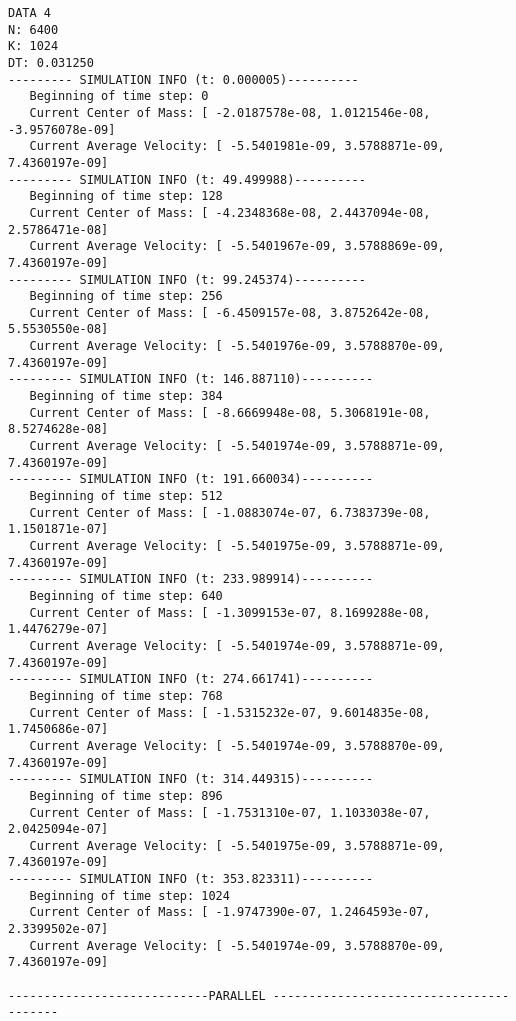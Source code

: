 \documentclass[11pt]{article}
\begin{document}
\begin{verbatim}
DATA 4
N: 6400
K: 1024
DT: 0.031250
--------- SIMULATION INFO (t: 0.000005)----------
   Beginning of time step: 0
   Current Center of Mass: [ -2.0187578e-08, 1.0121546e-08, -3.9576078e-09]
   Current Average Velocity: [ -5.5401981e-09, 3.5788871e-09, 7.4360197e-09]
--------- SIMULATION INFO (t: 49.499988)----------
   Beginning of time step: 128
   Current Center of Mass: [ -4.2348368e-08, 2.4437094e-08, 2.5786471e-08]
   Current Average Velocity: [ -5.5401967e-09, 3.5788869e-09, 7.4360197e-09]
--------- SIMULATION INFO (t: 99.245374)----------
   Beginning of time step: 256
   Current Center of Mass: [ -6.4509157e-08, 3.8752642e-08, 5.5530550e-08]
   Current Average Velocity: [ -5.5401976e-09, 3.5788870e-09, 7.4360197e-09]
--------- SIMULATION INFO (t: 146.887110)----------
   Beginning of time step: 384
   Current Center of Mass: [ -8.6669948e-08, 5.3068191e-08, 8.5274628e-08]
   Current Average Velocity: [ -5.5401974e-09, 3.5788871e-09, 7.4360197e-09]
--------- SIMULATION INFO (t: 191.660034)----------
   Beginning of time step: 512
   Current Center of Mass: [ -1.0883074e-07, 6.7383739e-08, 1.1501871e-07]
   Current Average Velocity: [ -5.5401975e-09, 3.5788871e-09, 7.4360197e-09]
--------- SIMULATION INFO (t: 233.989914)----------
   Beginning of time step: 640
   Current Center of Mass: [ -1.3099153e-07, 8.1699288e-08, 1.4476279e-07]
   Current Average Velocity: [ -5.5401974e-09, 3.5788871e-09, 7.4360197e-09]
--------- SIMULATION INFO (t: 274.661741)----------
   Beginning of time step: 768
   Current Center of Mass: [ -1.5315232e-07, 9.6014835e-08, 1.7450686e-07]
   Current Average Velocity: [ -5.5401974e-09, 3.5788870e-09, 7.4360197e-09]
--------- SIMULATION INFO (t: 314.449315)----------
   Beginning of time step: 896
   Current Center of Mass: [ -1.7531310e-07, 1.1033038e-07, 2.0425094e-07]
   Current Average Velocity: [ -5.5401975e-09, 3.5788871e-09, 7.4360197e-09]
--------- SIMULATION INFO (t: 353.823311)----------
   Beginning of time step: 1024
   Current Center of Mass: [ -1.9747390e-07, 1.2464593e-07, 2.3399502e-07]
   Current Average Velocity: [ -5.5401974e-09, 3.5788870e-09, 7.4360197e-09]

----------------------------PARALLEL ----------------------------------------


\end{verbatim}
\end{document}
